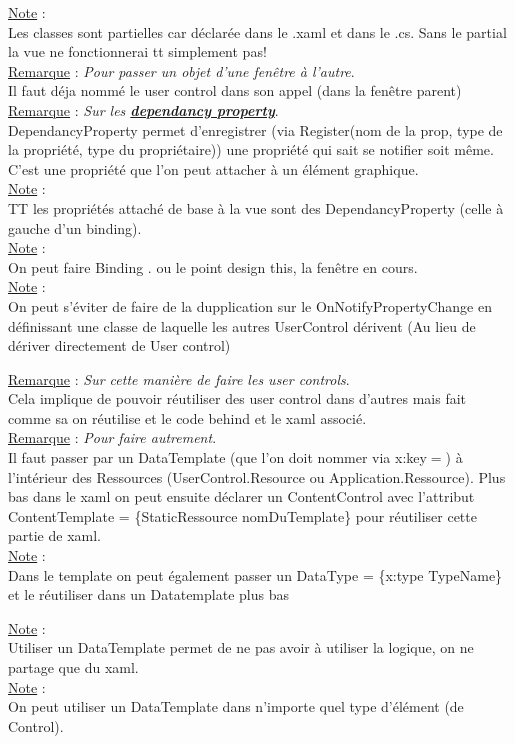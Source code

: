 \documentclass[a4paper,12pt,twoside]{article}
\newcommand{\urlcolor}{magenta}  %
\newcommand{\keycolor}{purple} %
\newcommand{\incode}[1]{{\footnotesize\ttfamily #1}} %
\newcommand{\rem}[2]{\noindent\underline{Remarque} : \textit{#1}.\\ \indent #2}
\newcommand{\note}[1]{\noindent\underline{Note} : \\ \indent #1}
\newcommand{\keyref}[2]{\hypersetup{urlcolor=\keycolor} \href{#1}{\textbf{#2}}\hypersetup{urlcolor=\urlcolor}}
\begin{document}
\note{Les classes sont partielles car déclarée dans le .xaml et dans le .cs. Sans le \incode{partial} la vue ne fonctionnerai tt simplement pas!}\\

\rem{Pour passer un objet d'une fenêtre à l'autre}{Il faut déja nommé le user control dans son appel (dans la fenêtre parent)}\\

\rem{Sur les \keyref{https://docs.microsoft.com/en-us/dotnet/desktop/wpf/properties/dependency-properties-overview?view=netdesktop-6.0}{dependancy property}}{DependancyProperty permet d'enregistrer (via Register(nom de la prop, type de la propriété, type du propriétaire)) une propriété qui sait se notifier soit même. C'est une propriété que l'on peut attacher à un élément graphique.}\\

\note{TT les propriétés attaché de base à la vue sont des DependancyProperty (celle à gauche d'un binding).}\\

\note{On peut faire Binding . ou le point design this, la fenêtre en cours.}\\

\note{On peut s'éviter de faire de la dupplication sur le OnNotifyPropertyChange en définissant une classe de laquelle les autres UserControl dérivent (Au lieu de dériver directement de User control)}

\rem{Sur cette manière de faire les user controls}{Cela implique de pouvoir réutiliser des user control dans d'autres mais fait comme sa on réutilise et le code behind et le xaml associé.}\\

\rem{Pour faire autrement}{Il faut passer par un DataTemplate (que l'on doit nommer via x:key$=$) à l'intérieur des Ressources (UserControl.Resource ou Application.Ressource). Plus bas dans le xaml on peut ensuite déclarer un ContentControl avec l'attribut ContentTemplate = \{StaticRessource nomDuTemplate\} pour réutiliser cette partie de xaml.}\\

\note{Dans le template on peut également passer un DataType = \{x:type TypeName\} et le réutiliser dans un Datatemplate plus bas}

\note{Utiliser un DataTemplate permet de ne pas avoir à utiliser la logique, on ne partage que du xaml.}\\

\note{On peut utiliser un DataTemplate dans n'importe quel type d'élément (de Control).}\\
\end{document}
